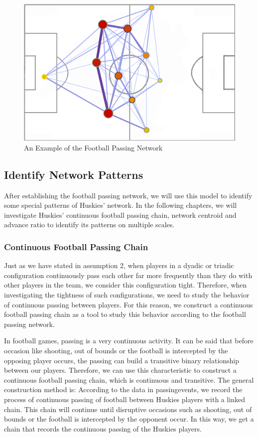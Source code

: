 \documentclass{mcmthesis}
\begin{document}
	\begin{figure}[h]
		\centering
		\includegraphics[width=\textwidth]{figures/playground.png}
		\caption{An Example of the Football Passing Network}
		\label{fig:playground}
	\end{figure}
\subsection{Identify Network Patterns}
	After establishing the football passing network, we will use this model to identify some special patterns of Huskies' network.  In the following chapters, we will investigate Huskies' continuous football passing chain, network centroid and advance ratio to identify its patterns on multiple scales. 
\subsubsection{Continuous Football Passing Chain}
	Just as we have stated in assumption 2, when players in a dyadic or triadic configuration continuously pass each other far more frequently than they do with other players in the team, we consider this configuration tight.  Therefore, when investigating the tightness of such configurations, we need to study the behavior of continuous passing between players.  For this reason, we construct a continuous football passing chain as a tool to study this behavior according to the football passing network.

	In football games, passing is a very continuous activity.  It can be said that before occasion like shooting, out of bounds or the football is intercepted by the opposing player occurs, the passing can build a transitive binary relationship between our players.  Therefore, we can use this characteristic to construct a continuous football passing chain, which is continuous and transitive.  The general construction method is: According to the data in passingevents, we record the process of continuous passing of football between Huskies players with a linked chain.  This chain will continue until disruptive occasions such as shooting, out of bounds or the football is intercepted by the opponent occur.  In this way, we get a chain that records the continuous passing of the Huskies players.
\end{document}
